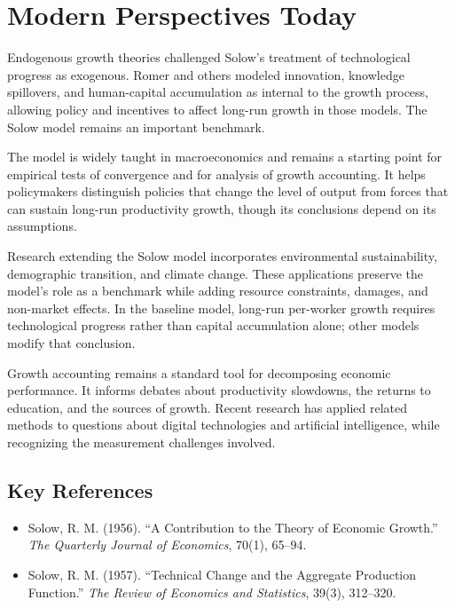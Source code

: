 \section{Modern Perspectives Today}
Endogenous growth theories challenged Solow's treatment of technological
progress as exogenous. Romer and others modeled innovation, knowledge
spillovers, and human-capital accumulation as internal to the growth process,
allowing policy and incentives to affect long-run growth in those models. The
Solow model remains an important benchmark.

The model is widely taught in macroeconomics and remains a starting point for
empirical tests of convergence and for analysis of growth accounting. It helps
policymakers distinguish policies that change the level of output from forces
that can sustain long-run productivity growth, though its conclusions depend
on its assumptions.

Research extending the Solow model incorporates environmental sustainability,
demographic transition, and climate change. These applications preserve the
model's role as a benchmark while adding resource constraints, damages, and
non-market effects. In the baseline model, long-run per-worker growth requires
technological progress rather than capital accumulation alone; other models
modify that conclusion.

Growth accounting remains a standard tool for decomposing economic
performance. It informs debates about productivity slowdowns, the returns to
education, and the sources of growth. Recent research has applied related
methods to questions about digital technologies and artificial intelligence,
while recognizing the measurement challenges involved.

\subsection*{Key References}
\begin{itemize}
    \item Solow, R. M. (1956). ``A Contribution to the Theory of Economic Growth.'' \textit{The Quarterly Journal of Economics}, 70(1), 65--94.
    \item Solow, R. M. (1957). ``Technical Change and the Aggregate Production Function.'' \textit{The Review of Economics and Statistics}, 39(3), 312--320.
\end{itemize}
